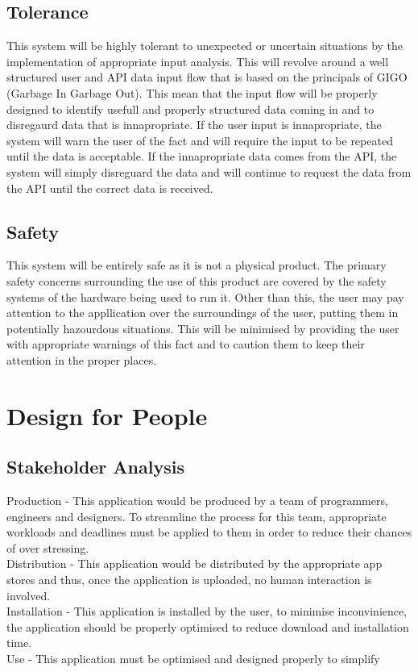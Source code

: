 \documentclass[paper=a4, fontsize=12pt]{scrartcl} %
\numberwithin{equation}{section} %
\numberwithin{figure}{section} %
\numberwithin{table}{section} %
\begin{document}
        \subsection{Tolerance}

            This system will be highly tolerant to unexpected or uncertain situations by the implementation of appropriate input analysis. This will revolve around a well structured user and API data input flow that is based on the principals of GIGO (Garbage In Garbage Out). This mean that the input flow will be properly designed to identify usefull and properly structured data coming in and to disregaurd data that is innapropriate. If the user input is innapropriate, the system will warn the user of the fact and will require the input to be repeated until the data is acceptable. If the innapropriate data comes from the API, the system will simply disreguard the data and will continue to request the data from the API until the correct data is received.

        \subsection{Safety}

            This system will be entirely safe as it is not a physical product. The primary safety concerns surrounding the use of this product are covered by the safety systems of the hardware being used to run it. Other than this, the user may pay attention to the appllication over the surroundings of the user, putting them in potentially hazourdous situations. This will be minimised by providing the user with appropriate warnings of this fact and to caution them to keep their attention in the proper places.

    \section{Design for People}

        \subsection{Stakeholder Analysis}

            Production - This application would be produced by a team of programmers, engineers and designers. To streamline the process for this team, appropriate workloads and deadlines must be applied to them in order to reduce their chances of over stressing.\\

            Distribution - This application would be distributed by the appropriate app stores and thus, once the application is uploaded, no human interaction is involved.\\

            Installation - This application is installed by the user, to minimise inconvinience, the application should be properly optimised to reduce download and installation time.\\

            Use - This application must be optimised and designed properly to simplify 
\end{document}
